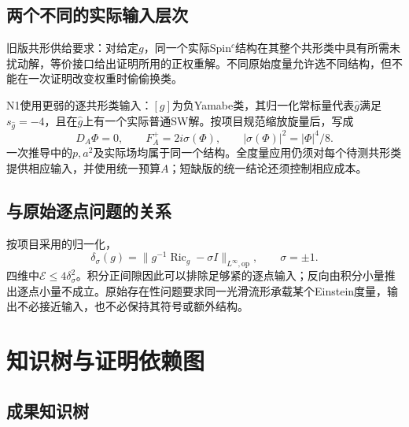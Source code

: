 \documentclass[UTF8,fontset=fandol,zihao=-4,a4paper]{ctexart}
\theoremstyle{remark}
\DeclareMathOperator{\Ric}{Ric}
\newcommand{\E}{\mathcal E}
\begin{document}
\subsection{两个不同的实际输入层次}

旧版共形供给要求：对给定$g$，同一个实际Spin$^c$结构在其整个共形类中具有所需未扰动解，等价接口给出证明所用的正权重解。不同原始度量允许选不同结构，但不能在一次证明改变权重时偷偷换类。

N1使用更弱的逐共形类输入：$[g]$为负Yamabe类，其归一化常标量代表$\widehat g$满足$s_{\widehat g}=-4$，且在$\widehat g$上有一个实际普通SW解。按项目规范缩放旋量后，写成
\begin{equation}
D_A\Phi=0,\qquad F_A^+=2i\sigma(\Phi),\qquad
|\sigma(\Phi)|^2=|\Phi|^4/8.
\label{eq:single}
\end{equation}
一次推导中的$p,a^2$及实际场均属于同一个结构。全度量应用仍须对每个待测共形类提供相应输入，并使用统一预算$A$；短缺版的统一结论还须控制相应成本。

\subsection{与原始逐点问题的关系}

按项目采用的归一化，
\[
\delta_\sigma(g)=\|g^{-1}\Ric_g-\sigma I\|_{L^\infty,\mathrm{op}},
\qquad \sigma=\pm1.
\]
四维中$\E\le4\delta_\sigma^2$。积分正间隙因此可以排除足够紧的逐点输入；反向由积分小量推出逐点小量不成立。原始存在性问题要求同一光滑流形承载某个Einstein度量，输出不必接近输入，也不必保持其符号或额外结构。

\section{知识树与证明依赖图}

\subsection{成果知识树}
\end{document}
